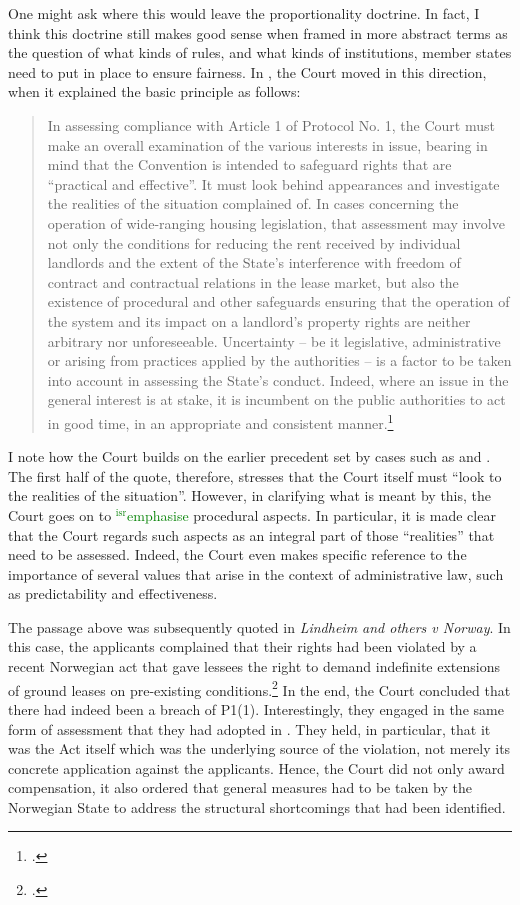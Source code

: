 \documentclass[12pt,a4paper]{book} %
\newcommand{\isr}[1]{\textcolor{green}{$^{\textrm{isr}}${#1}}}
\begin{document}
One might ask where this would leave the proportionality doctrine. In fact, I think this doctrine still makes good sense when framed in more abstract terms as the question of what kinds of rules, and what kinds of institutions, member states need to put in place to ensure fairness. In \textcite{hutten06}, the Court moved in this direction, when it explained the basic principle as follows:

\begin{quote}
In assessing compliance with Article 1 of Protocol No. 1, the Court must make an overall examination of the various interests in issue, bearing in mind that the Convention is intended to safeguard rights that are “practical and effective”. It must look behind appearances and investigate the realities of the situation complained of. In cases concerning the operation of wide-ranging housing legislation, that assessment may involve not only the conditions for reducing the rent received by individual landlords and the extent of the State’s interference with freedom of contract and contractual relations in the lease market, but also the existence of procedural and other safeguards ensuring that the operation of the system and its impact on a landlord’s property rights are neither arbitrary nor unforeseeable. Uncertainty – be it legislative, administrative or arising from practices applied by the authorities – is a factor to be taken into account in assessing the State’s conduct. Indeed, where an issue in the general interest is at stake, it is incumbent on the public authorities to act in good time, in an appropriate and consistent manner.\footcite[151]{hutten06} 
\end{quote}

I note how the Court builds on the earlier precedent set by cases such as \textcite{sporrong82} and \textcite{james86}. The first half of the quote, therefore, stresses that the Court itself must ``look to the realities of the situation''. However, in clarifying what is meant by this, the Court goes on to \isr{emphasise} procedural aspects. In particular, it is made clear that the Court regards such aspects as an integral part of those ``realities'' that need to be assessed. Indeed, the Court even makes specific reference to the importance of several values that arise in the context of administrative law, such as predictability and effectiveness.

The passage above was subsequently quoted in {\it Lindheim and others v Norway}. In this case, the applicants complained that their rights had been violated by a recent Norwegian act that gave lessees the right to demand indefinite extensions of ground leases on pre-existing conditions.\footcite[119]{lindheim12}  In the end, the Court concluded that there had indeed been a breach of P1(1). Interestingly, they engaged in the same form of assessment that they had adopted in \textcite{hutten06}. They held, in particular, that it was the Act itself which was the underlying source of the violation, not merely its concrete application against the applicants. Hence, the Court did not only award compensation, it also ordered that general measures had to be taken by the Norwegian State to address the structural shortcomings that had been identified.
\end{document}
